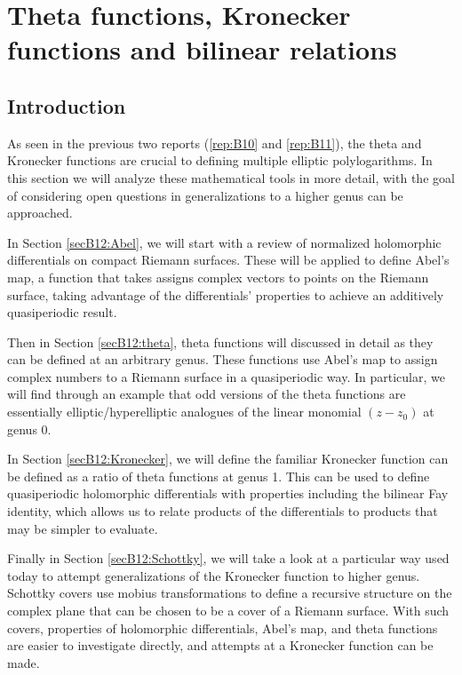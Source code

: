 

\newcommand{\bolde}[0]{\mathbf{e}}

\newcommand{\hcancel}[2][black]{\setbox0=\hbox{$#2$}\rlap{\raisebox{.3\ht0}{\textcolor{#1}{\rule{\wd0}{1pt}}}}#2} 

\chapter{Theta functions, Kronecker functions and bilinear relations}
\label{rep:B12}

\section{Introduction}

As seen in the previous two reports (\ref{rep:B10} and \ref{rep:B11}), the theta and Kronecker functions are crucial to defining multiple elliptic polylogarithms. In this section we will analyze these mathematical tools in more detail, with the goal of considering open questions in generalizations to a higher genus can be approached.

In Section \ref{secB12:Abel}, we will start with a review of normalized holomorphic differentials on compact Riemann surfaces. These will be applied to define Abel's map, a function that takes assigns complex vectors to points on the Riemann surface, taking advantage of the differentials' properties to achieve an additively quasiperiodic result.

Then in Section \ref{secB12:theta}, theta functions will discussed in detail as they can be defined at an arbitrary genus. These functions use Abel's map to assign complex numbers to a Riemann surface in a quasiperiodic way. In particular, we will find through an example that odd versions of the theta functions are essentially elliptic/hyperelliptic analogues of the linear monomial $(z-z_0)$ at genus 0.

In Section \ref{secB12:Kronecker}, we will define the familiar Kronecker function can be defined as a ratio of theta functions at genus 1. This can be used to define quasiperiodic holomorphic differentials with properties including the bilinear Fay identity, which allows us to relate products of the differentials to products that may be simpler to evaluate.

Finally in Section \ref{secB12:Schottky}, we will take a look at a particular way used today to attempt generalizations of the Kronecker function to higher genus. Schottky covers use mobius transformations to define a recursive structure on the complex plane that can be chosen to be a cover of a Riemann surface. With such covers, properties of holomorphic differentials, Abel's map, and theta functions are easier to investigate directly, and attempts at a Kronecker function can be made.


